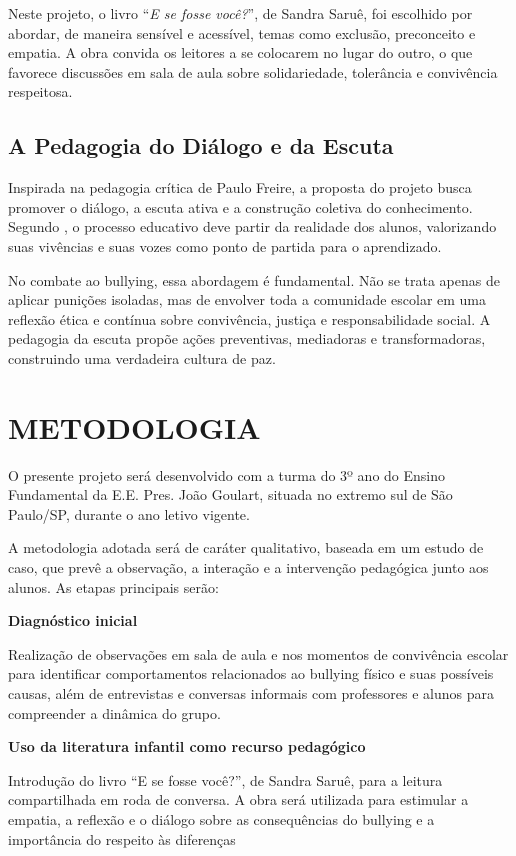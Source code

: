 			Neste projeto, o livro “\textit{E se fosse você?}”, de Sandra Saruê, foi escolhido por abordar, de maneira sensível e acessível, temas como exclusão, preconceito e empatia. A obra convida os leitores a se colocarem no lugar do outro, o que favorece discussões em sala de aula sobre solidariedade, tolerância e convivência respeitosa. 
			
		\subsection{A Pedagogia do Diálogo e da Escuta}
			Inspirada na pedagogia crítica de Paulo Freire, a proposta do projeto busca promover o diálogo, a escuta ativa e a construção coletiva do conhecimento. Segundo , o processo educativo deve partir da realidade dos alunos, valorizando suas vivências e suas vozes como ponto de partida para o aprendizado.
			
			No combate ao bullying, essa abordagem é fundamental. Não se trata apenas de aplicar punições isoladas, mas de envolver toda a comunidade escolar em uma reflexão ética e contínua sobre convivência, justiça e responsabilidade social. A pedagogia da escuta propõe ações preventivas, mediadoras e transformadoras, construindo uma verdadeira cultura de paz.
	
	
	\section{METODOLOGIA}
	
		O presente projeto será desenvolvido com a turma do 3º ano do Ensino Fundamental da E.E. Pres. João Goulart, situada no extremo sul de São Paulo/SP, durante o ano letivo vigente.
		
		A metodologia adotada será de caráter qualitativo, baseada em um estudo de caso, que prevê a observação, a interação e a intervenção pedagógica junto aos alunos. As etapas principais serão:
		
		\textbf{Diagnóstico inicial}
		
		Realização de observações em sala de aula e nos momentos de convivência escolar para identificar comportamentos relacionados ao bullying físico e suas possíveis causas, além de entrevistas e conversas informais com professores e alunos para compreender a dinâmica do grupo.
		
		\textbf{Uso da literatura infantil como recurso pedagógico}
		
		Introdução do livro “E se fosse você?”, de Sandra Saruê, para a leitura compartilhada em roda de conversa. A obra será utilizada para estimular a empatia, a reflexão e o diálogo sobre as consequências do bullying e a importância do respeito às diferenças
		
